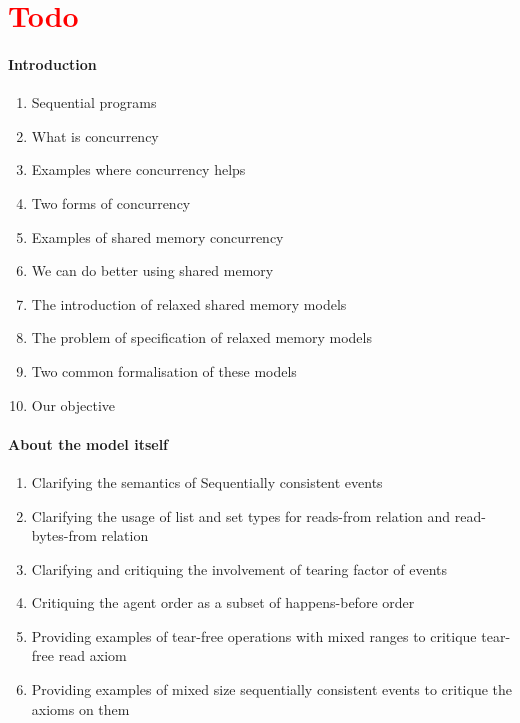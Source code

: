
\section{\textcolor{red}{Todo}}

    \paragraph{Introduction}
    \begin{enumerate}
        \item Sequential programs
        \item What is concurrency
        \item Examples where concurrency helps
        \item Two forms of concurrency
        \item Examples of shared memory concurrency
        \item We can do better using shared memory
        \item The introduction of relaxed shared memory models 
        \item The problem of specification of relaxed memory models
        \item Two common formalisation of these models
        \item Our objective
    \end{enumerate}

    \paragraph{About the model itself}
    \begin{enumerate}
        \item Clarifying the semantics of Sequentially consistent events 
        \item Clarifying the usage of list and set  types for reads-from relation and read-bytes-from relation
        \item Clarifying and critiquing the involvement of tearing factor of events
        \item Critiquing the agent order as a subset of happens-before order
        \item Providing examples of tear-free operations with mixed ranges to critique tear-free read axiom
        \item Providing examples of mixed size sequentially consistent events to critique the axioms on them
    \end{enumerate}
    
